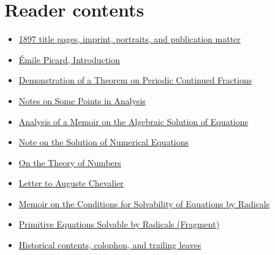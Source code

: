 \documentclass[11pt,oneside,openany]{book}
\begin{document}
\chapter*{Reader contents}
\begin{itemize}
  \item \hyperlink{source-007}{1897 title pages, imprint, portraits, and publication matter}
  \item \hyperlink{source-024}{Émile Picard, Introduction}
  \item \hyperlink{source-030}{Demonstration of a Theorem on Periodic Continued Fractions}
  \item \hyperlink{source-038}{Notes on Some Points in Analysis}
  \item \hyperlink{source-040}{Analysis of a Memoir on the Algebraic Solution of Equations}
  \item \hyperlink{source-042}{Note on the Solution of Numerical Equations}
  \item \hyperlink{source-044}{On the Theory of Numbers}
  \item \hyperlink{source-054}{Letter to Auguste Chevalier}
  \item \hyperlink{source-062}{Memoir on the Conditions for Solvability of Equations by Radicals}
  \item \hyperlink{source-080}{Primitive Equations Solvable by Radicals (Fragment)}
  \item \hyperlink{source-092}{Historical contents, colophon, and trailing leaves}
\end{itemize}
\mainmatter
{}











\end{document}

